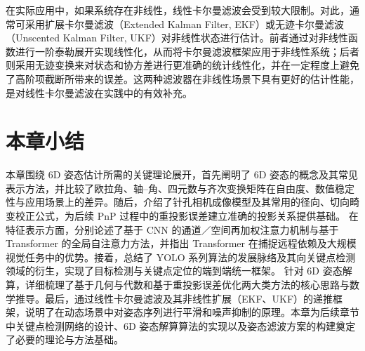 在实际应用中，如果系统存在非线性，线性卡尔曼滤波会受到较大限制。对此，通常可采用扩展卡尔曼滤波（Extended Kalman Filter, EKF）或无迹卡尔曼滤波（Unscented Kalman Filter, UKF）对非线性状态进行估计。前者通过对非线性函数进行一阶泰勒展开实现线性化，从而将卡尔曼滤波框架应用于非线性系统；后者则采用无迹变换来对状态和协方差进行更准确的统计线性化，并在一定程度上避免了高阶项截断所带来的误差。这两种滤波器在非线性场景下具有更好的估计性能，是对线性卡尔曼滤波在实践中的有效补充。




\section{本章小结}
\label{sec:summary}

本章围绕 6D 姿态估计所需的关键理论展开，首先阐明了 6D 姿态的概念及其常见表示方法，并比较了欧拉角、轴–角、四元数与齐次变换矩阵在自由度、数值稳定性与应用场景上的差异。随后，介绍了针孔相机成像模型及其常用的径向、切向畸变校正公式，为后续 PnP 过程中的重投影误差建立准确的投影关系提供基础。
在特征表示方面，分别论述了基于 CNN 的通道／空间再加权注意力机制与基于 Transformer 的全局自注意力方法，并指出 Transformer 在捕捉远程依赖及大规模视觉任务中的优势。接着，总结了 YOLO 系列算法的发展脉络及其向关键点检测领域的衍生，实现了目标检测与关键点定位的端到端统一框架。
针对 6D 姿态解算，详细梳理了基于几何与代数和基于重投影误差优化两大类方法的核心思路与数学推导。最后，通过线性卡尔曼滤波及其非线性扩展（EKF、UKF）的递推框架，说明了在动态场景中对姿态序列进行平滑和噪声抑制的原理。本章为后续章节中关键点检测网络的设计、6D 姿态解算算法的实现以及姿态滤波方案的构建奠定了必要的理论与方法基础。
